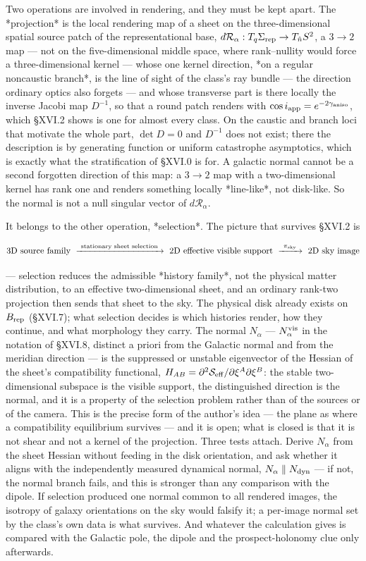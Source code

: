Two operations are involved in rendering, and they must be kept apart. The *projection* is the local rendering map of a sheet on the three-dimensional spatial source patch of the representational base, $d\mathcal R_\alpha:T_q\Sigma_{\rm rep}\to T_{\hat n}S^2$, a $3\to2$ map — not on the five-dimensional middle space, where rank–nullity would force a three-dimensional kernel — whose one kernel direction, *on a regular noncaustic branch*, is the line of sight of the class's ray bundle — the direction ordinary optics also forgets — and whose transverse part is there locally the inverse Jacobi map $D^{-1}$, so that a round patch renders with $\cos i_{\rm app} = e^{-2\gamma_{\rm aniso} }$, which §XVI.2 shows is one for almost every class. On the caustic and branch loci that motivate the whole part, $\det D = 0$ and $D^{-1}$ does not exist; there the description is by generating function or uniform catastrophe asymptotics, which is exactly what the stratification of §XVI.0 is for. A galactic normal cannot be a second forgotten direction of this map: a $3\to2$ map with a two-dimensional kernel has rank one and renders something locally *line-like*, not disk-like. So the normal is not a null singular vector of $d\mathcal R_\alpha$.

It belongs to the other operation, *selection*. The picture that survives §XVI.2 is

$$\text{3D source family}\ \xrightarrow{\ \text{stationary sheet selection}\ }\ \text{2D effective visible support}\ \xrightarrow{\ \pi_{\rm sky}\ }\ \text{2D sky image}$$

— selection reduces the admissible *history family*, not the physical matter distribution, to an effective two-dimensional sheet, and an ordinary rank-two projection then sends that sheet to the sky. The physical disk already exists on $B_{\rm rep}$ (§XVI.7); what selection decides is which histories render, how they continue, and what morphology they carry. The normal $N_\alpha$ — $N_\alpha^{\rm vis}$ in the notation of §XVI.8, distinct a priori from the Galactic normal and from the meridian direction — is the suppressed or unstable eigenvector of the Hessian of the sheet's compatibility functional, $H_{AB} = \partial^2\mathcal S_{\rm eff}/\partial\xi^A\partial\xi^B$: the stable two-dimensional subspace is the visible support, the distinguished direction is the normal, and it is a property of the selection problem rather than of the sources or of the camera. This is the precise form of the author's idea — the plane as where a compatibility equilibrium survives — and it is open; what is closed is that it is not shear and not a kernel of the projection. Three tests attach. Derive $N_\alpha$ from the sheet Hessian without feeding in the disk orientation, and ask whether it aligns with the independently measured dynamical normal, $N_\alpha\parallel N_{\rm dyn}$ — if not, the normal branch fails, and this is stronger than any comparison with the dipole. If selection produced one normal common to all rendered images, the isotropy of galaxy orientations on the sky would falsify it; a per-image normal set by the class's own data is what survives. And whatever the calculation gives is compared with the Galactic pole, the dipole and the prospect-holonomy clue only afterwards.

